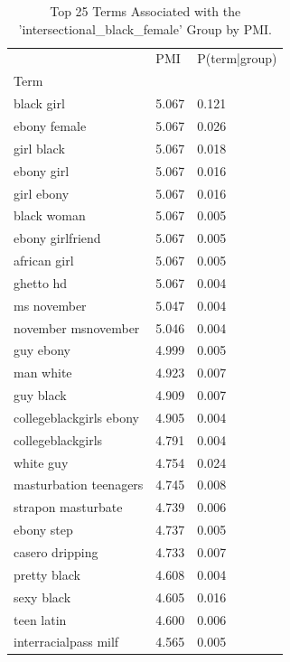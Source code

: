 \begin{table}[htbp]
\centering
\caption{Top 25 Terms Associated with the 'intersectional_black_female' Group by PMI.}
\label{tab:pmi-intersectional_black_women}
\begin{tabular}{lll}
\toprule
 & PMI & P(term|group) \\
Term &  &  \\
\midrule
black girl & 5.067 & 0.121 \\
ebony female & 5.067 & 0.026 \\
girl black & 5.067 & 0.018 \\
ebony girl & 5.067 & 0.016 \\
girl ebony & 5.067 & 0.016 \\
black woman & 5.067 & 0.005 \\
ebony girlfriend & 5.067 & 0.005 \\
african girl & 5.067 & 0.005 \\
ghetto hd & 5.067 & 0.004 \\
ms november & 5.047 & 0.004 \\
november msnovember & 5.046 & 0.004 \\
guy ebony & 4.999 & 0.005 \\
man white & 4.923 & 0.007 \\
guy black & 4.909 & 0.007 \\
collegeblackgirls ebony & 4.905 & 0.004 \\
collegeblackgirls & 4.791 & 0.004 \\
white guy & 4.754 & 0.024 \\
masturbation teenagers & 4.745 & 0.008 \\
strapon masturbate & 4.739 & 0.006 \\
ebony step & 4.737 & 0.005 \\
casero dripping & 4.733 & 0.007 \\
pretty black & 4.608 & 0.004 \\
sexy black & 4.605 & 0.016 \\
teen latin & 4.600 & 0.006 \\
interracialpass milf & 4.565 & 0.005 \\
\bottomrule
\end{tabular}

\end{table}